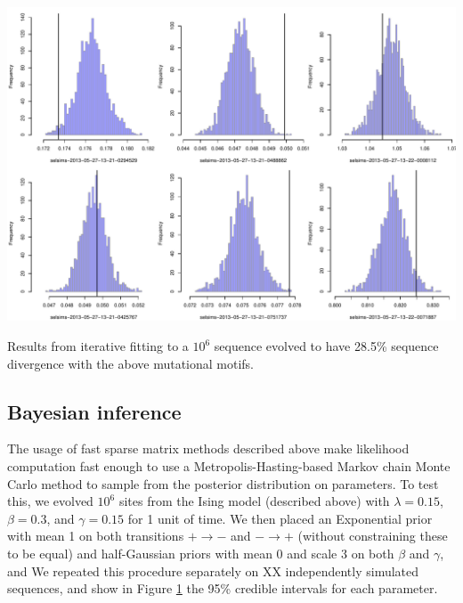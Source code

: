\documentclass{article}
\theoremstyle{plain}
\theoremstyle{definition}
\begin{document}
\begin{table}
  \begin{center}
    \includegraphics[width=\textwidth]{writeup-plots/tasep_all-mcmc-runs}
  \end{center}
  \caption{ Results from iterative fitting to a $10^6$ sequence evolved to have 28.5\% sequence divergence
    with the above mutational motifs.
    \label{tab:cpg_results} }
\end{table}


\subsection{Bayesian inference}

The usage of fast sparse matrix methods described above make likelihood computation fast enough
to use a Metropolis-Hasting-based Markov chain Monte Carlo method
to sample from the posterior distribution on parameters.
To test this,
we evolved $10^6$ sites from the Ising model (described above) with $\lambda=0.15$, $\beta=0.3$, and $\gamma=0.15$
for 1 unit of time.
We then placed an Exponential prior with mean 1 on both transitions $+ \to -$ and $- \to +$
(without constraining these to be equal)
and half-Gaussian priors with mean 0 and scale 3 on both $\beta$ and $\gamma$,
and 
We repeated this procedure separately on XX independently simulated sequences,
and show in Figure \ref{fig:ising_coverage}
the 95\% credible intervals for each parameter.

\begin{figure}
    \begin{center} 
    \end{center} 
    \caption{
        \label{fig:ising_coverage}}
\end{figure}
\end{document}
